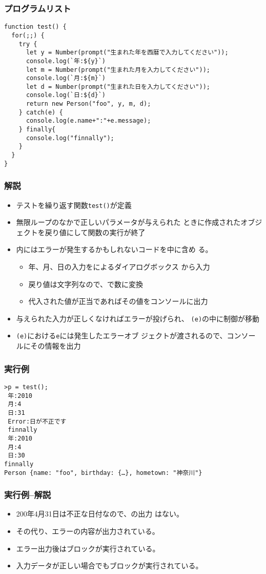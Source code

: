 \begin{frame}[containsverbatim]
 \frametitle{プログラムリスト}
 {\scriptsize
\begin{Verbatim}
function test() {
  for(;;) {
    try {
      let y = Number(prompt("生まれた年を西暦で入力してください"));
      console.log(`年:${y}`)
      let m = Number(prompt("生まれた月を入力してください"));
      console.log(`月:${m}`)
      let d = Number(prompt("生まれた日を入力してください"));
      console.log(`日:${d}`)
      return new Person("foo", y, m, d);
    } catch(e) {
      console.log(e.name+":"+e.message);
    } finally{
      console.log("finnally");
    }
  }
}
\end{Verbatim}
}
\end{frame}
\begin{frame}[containsverbatim]
 \frametitle{解説}
\begin{itemize}
 \item テストを繰り返す関数\texttt{test()}が定義
 \item 無限ループのなかで正しいパラメータが与えられた
			 ときに作成されたオブジェクトを戻り値にして関数の実行が終了
 \item {}内にはエラーが発生するかもしれないコードを中に含め
			 る。
	\begin{itemize}
	 \item 年、月、日の入力をによるダイアログボックス
				 から入力
	 \item 戻り値は文字列なので、で数に変換
   \item 代入された値が正当であればその値をコンソールに出力
	\end{itemize}
 \item 与えられた入力が正しくなければエラーが投げられ、
			 \texttt{(e)}の中に制御が移動
 \item {}\texttt{(e)}における\texttt{e}には発生したエラーオブ
			 ジェクトが渡されるので、コンソールにその情報を出力
\end{itemize}
\end{frame}
\begin{frame}[containsverbatim]
 \frametitle{実行例}
 {\scriptsize
\begin{Verbatim}
>p = test();
 年:2010
 月:4
 日:31
 Error:日が不正です
 finnally
 年:2010
 月:4
 日:30
finnally
Person {name: "foo", birthday: {…}, hometown: "神奈川"}
\end{Verbatim}
 }
\end{frame}
\begin{frame}[containsverbatim]
 \frametitle{実行例--解説}
\begin{itemize}
 \item 200年4月31日は不正な日付なので、の出力
       はない。
 \item その代り、エラーの内容が出力されている。
 \item エラー出力後はブロックが実行されている。
 \item 入力データが正しい場合でもブロックが実行されている。
\end{itemize}\end{frame}

